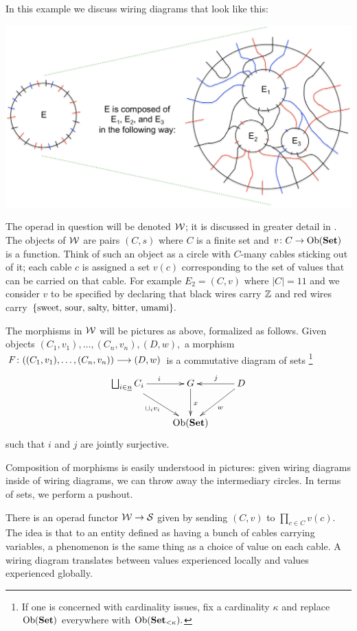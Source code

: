 \documentclass[../main/CT4S-EN-RU]{subfiles}
\begin{document}
\begin{exampleENG}
In this example we discuss wiring diagrams that look like this:
\begin{center}
\includegraphics[width=\textwidth]{wiringDiagram}
\end{center}
The operad in question will be denoted $\mathcal{W}$; it is discussed in greater detail in \cite{Sp4}. The objects of $\mathcal{W}$ are pairs $(C,s)$ where $C$ is a finite set and $v\colon C\rightarrow\operatorname{Ob}({\mathbf{Set}})$ is a function. Think of such an object as a circle with $C$-many cables sticking out of it; each cable $c$ is assigned a set $v(c)$ corresponding to the set of values that can be carried on that cable. For example $E_2=(C,v)$ where $|C|=11$ and we consider $v$ to be specified by declaring that black wires carry ${\mathbb Z}$ and red wires carry $\{\textnormal{sweet, sour, salty, bitter, umami}\}.$ 

The morphisms in $\mathcal{W}$ will be pictures as above, formalized as follows. Given objects $(C_1,v_1),\ldots,(C_n,v_n), (D,w),$ a morphism $F\colon((C_1,v_1),\ldots,(C_n,v_n))\longrightarrow (D,w)$ is a commutative diagram of sets
\footnote{If one is concerned with cardinality issues, fix a cardinality $\kappa$ and replace $\operatorname{Ob}({\mathbf{Set}})$ everywhere with $\operatorname{Ob}({\mathbf{Set}}_{<\kappa}).$} 
$$
\xymatrix{\bigsqcup_{i\in\ul{n}}C_i\ar[rd]_{\sqcup_iv_i}\ar[r]^i&G\ar[d]^x&D\ar[l]_j\ar[ld]^w\\&\Ob(\Set)}
$$
such that $i$ and $j$ are jointly surjective.

Composition of morphisms is easily understood in pictures: given wiring diagrams inside of wiring diagrams, we can throw away the intermediary circles. In terms of sets, we perform a pushout.

There is an operad functor $\mathcal{W}\rightarrow\mathcal{S}$ given by sending $(C,v)$ to $\prod_{c\in C}v(c).$ The idea is that to an entity defined as having a bunch of cables carrying variables, a phenomenon is the same thing as a choice of value on each cable. A wiring diagram translates between values experienced locally and values experienced globally. 
\end{exampleENG}
\end{document}
